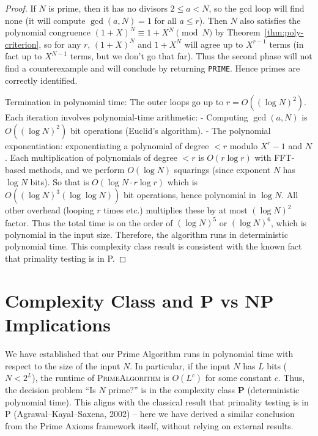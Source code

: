 \documentclass[11pt]{article}
\begin{document}
\begin{proof}
If $N$ is prime, then it has no divisors $2 \le a < N$, so the gcd loop will find none (it will compute $\gcd(a,N)=1$ for all $a \le r$). Then $N$ also satisfies the polynomial congruence $(1+X)^N \equiv 1+X^N \pmod{N}$ by Theorem~\ref{thm:poly-criterion}, so for any $r$, $(1+X)^N$ and $1+X^N$ will agree up to $X^{r-1}$ terms (in fact up to $X^{N-1}$ terms, but we don’t go that far). Thus the second phase will not find a counterexample and will conclude by returning \texttt{PRIME}. Hence primes are correctly identified.

Termination in polynomial time: The outer loops go up to $r = O((\log N)^2)$. Each iteration involves polynomial-time arithmetic:
- Computing $\gcd(a,N)$ is $O((\log N)^2)$ bit operations (Euclid’s algorithm).
- The polynomial exponentiation: exponentiating a polynomial of degree $<r$ modulo $X^r-1$ and $N$. Each multiplication of polynomials of degree $<r$ is $O(r \log r)$ with FFT-based methods, and we perform $O(\log N)$ squarings (since exponent $N$ has $\log N$ bits). So that is $O(\log N \cdot r \log r)$ which is $O((\log N)^3 (\log\log N))$ bit operations, hence polynomial in $\log N$. All other overhead (looping $r$ times etc.) multiplies these by at most $(\log N)^2$ factor. Thus the total time is on the order of $(\log N)^5$ or $(\log N)^6$, which is polynomial in the input size. Therefore, the algorithm runs in deterministic polynomial time. This complexity class result is consistent with the known fact that primality testing is in P.
\end{proof}

\section{Complexity Class and P vs NP Implications}
We have established that our Prime Algorithm runs in polynomial time with respect to the size of the input $N$. In particular, if the input $N$ has $L$ bits ($N < 2^L$), the runtime of \textsc{PrimeAlgorithm} is $O(L^c)$ for some constant $c$. Thus, the decision problem “Is $N$ prime?” is in the complexity class $\mathbf{P}$ (deterministic polynomial time). This aligns with the classical result that primality testing is in P (Agrawal–Kayal–Saxena, 2002) – here we have derived a similar conclusion from the Prime Axioms framework itself, without relying on external results.
\end{document}
